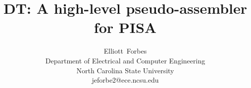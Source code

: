 \documentclass[10pt,conference,onecolumn,letterpaper]{IEEEtran}
\begin{document}
%
\title{DT: A high-level pseudo-assembler for PISA}


%


\ifCLASSOPTIONpeerreview
\else
\author{Elliott~Forbes\\Department of Electrical
        and Computer Engineering\\North Carolina State University\\
        jeforbe2@ece.ncsu.edu}%
\fi

% 



\end{document}
